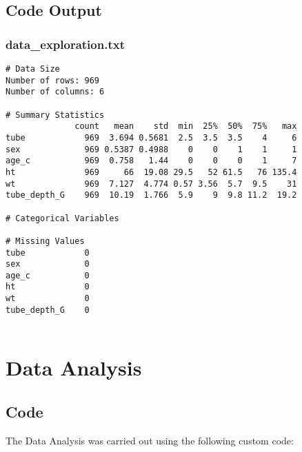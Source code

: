 \documentclass[11pt]{article}
\begin{document}
\subsection{Code Output}

\subsubsection*{data\_exploration.txt}

\begin{Verbatim}[tabsize=4]
# Data Size
Number of rows: 969
Number of columns: 6

# Summary Statistics
              count   mean    std  min  25%  50%  75%   max
tube            969  3.694 0.5681  2.5  3.5  3.5    4     6
sex             969 0.5387 0.4988    0    0    1    1     1
age_c           969  0.758   1.44    0    0    0    1     7
ht              969     66  19.08 29.5   52 61.5   76 135.4
wt              969  7.127  4.774 0.57 3.56  5.7  9.5    31
tube_depth_G    969  10.19  1.766  5.9    9  9.8 11.2  19.2

# Categorical Variables

# Missing Values
tube            0
sex             0
age_c           0
ht              0
wt              0
tube_depth_G    0


\end{Verbatim}

\section{Data Analysis}
\subsection{{Code}}
The Data Analysis was carried out using the following custom code:
\end{document}
